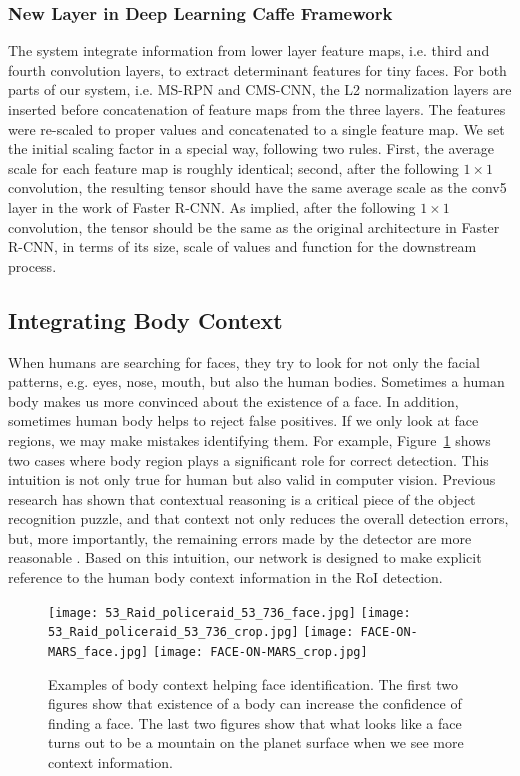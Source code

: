 \documentclass[10pt,journal,cspaper,compsoc]{IEEEtran}
\begin{document}
\subsubsection{New Layer in Deep Learning Caffe Framework}
\label{subsec:ms_caffe}

The system integrate information from lower layer feature maps, i.e. third and fourth convolution layers, to extract determinant features for tiny faces. For both parts of our system, i.e. MS-RPN and CMS-CNN, the L2 normalization layers are inserted before concatenation of feature maps from the three layers. The features were re-scaled to proper values and concatenated to a single feature map. We set the initial scaling factor in a special way, following two rules. First, the average scale for each feature map is roughly identical; second, after the following $1\times 1$ convolution, the resulting tensor should have the same average scale as the conv5 layer in the work of Faster R-CNN. As implied, after the following $1\times 1$ convolution, the tensor should be the same as the original architecture in Faster R-CNN, in terms of its size, scale of values and function for the downstream process.  

\subsection{Integrating Body Context}
\label{subsec:context}
When humans are searching for faces, they try to look for not only the facial patterns, e.g. eyes, nose, mouth, but also the human bodies. Sometimes a human body makes us more convinced about the existence of a face. In addition, sometimes human body helps to reject false positives. If we only look at face regions, we may make mistakes identifying them. For example, Figure~\ref{fig:body_context} shows two cases where body region plays a significant role for correct detection. This intuition is not only true for human but also valid in computer vision. Previous research has shown that contextual reasoning is a critical piece of the object recognition puzzle, and that context not only reduces the overall detection errors, but, more importantly, the remaining errors made by the detector are more reasonable \cite{divvala2009empirical}. Based on this intuition, our network is designed to make explicit reference to the human body context information in the RoI detection.
\begin{figure}
\centering
\texttt{[image: 53\_Raid\_policeraid\_53\_736\_face.jpg]}
\texttt{[image: 53\_Raid\_policeraid\_53\_736\_crop.jpg]}
\texttt{[image: FACE-ON-MARS\_face.jpg]}
\texttt{[image: FACE-ON-MARS\_crop.jpg]}
\caption{Examples of body context helping face identification. The first two figures show that existence of a body can increase the confidence of finding a face. The last two figures show that what looks like a face turns out to be a mountain on the planet surface when we see more context information.}
\label{fig:body_context}
\end{figure}
\end{document}
